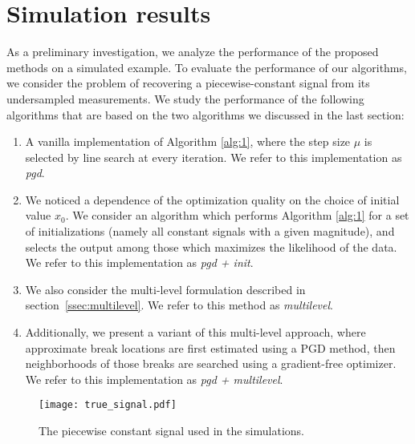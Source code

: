 \documentclass[onecolumn]{IEEEtran}
\begin{document}





\section{Simulation results}\label{sec:sim}


As a preliminary investigation, we analyze the performance of the proposed methods on a simulated example.
To evaluate the performance of our algorithms, we consider the problem of recovering a piecewise-constant signal from its undersampled measurements.  We study the performance of the
following algorithms that are based on the two algorithms we discussed in the last section:
\begin{enumerate}
  \item A vanilla implementation of Algorithm \ref{alg:1}, where the step size $\mu$ is selected by line search at every iteration.
  We refer to this implementation as \emph{pgd}.
  \item We noticed a dependence of the optimization quality on the choice of initial value $x_0$. We consider an algorithm which performs
  Algorithm \ref{alg:1} for a set of initializations (namely all constant signals with a given magnitude), and selects the output among those which maximizes
  the likelihood of the data. We refer to this implementation as \emph{pgd + init}.
  \item We also consider the multi-level formulation described in section~\ref{ssec:multilevel}. We refer to this
  method as \emph{multilevel}.
  \item Additionally, we present a variant of this multi-level approach, where approximate break locations are first estimated using a PGD method, then neighborhoods
  of those breaks are searched using a gradient-free optimizer. We refer to this implementation as \emph{pgd + multilevel}.
\end{enumerate}
\begin{figure}
\begin{center}
\texttt{[image: true\_signal.pdf]}
\caption{The piecewise constant signal used in the simulations. \label{fig:truesignal_sim}}
\end{center}
\end{figure}
\end{document}

